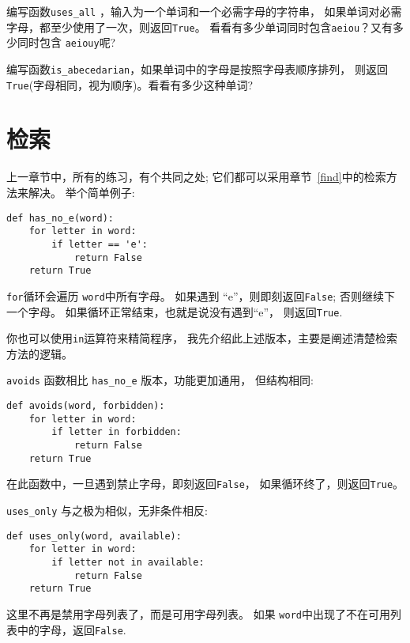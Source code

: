 \documentclass[10pt]{book}
\begin{document}
\begin{exercise} 

编写函数\verb"uses_all" ，输入为一个单词和一个必需字母的字符串，
如果单词对必需字母，都至少使用了一次，则返回{\tt True}。
看看有多少单词同时包含{\tt aeiou}？又有多少同时包含 {\tt aeiouy}呢?

\end{exercise}


\begin{exercise}
编写函数\verb"is_abecedarian"，如果单词中的字母是按照字母表顺序排列，
则返回 {\tt True}(字母相同，视为顺序)。看看有多少这种单词?


\end{exercise}


\section{检索}
\label{search}

上一章节中，所有的练习，有个共同之处;
它们都可以采用章节~\ref{find}中的检索方法来解决。
举个简单例子:

\begin{verbatim}
def has_no_e(word):
    for letter in word:
        if letter == 'e':
            return False
    return True
\end{verbatim}
%
{\tt for}循环会遍历 {\tt word}中所有字母。
如果遇到 ``e''，则即刻返回{\tt False};
否则继续下一个字母。
如果循环正常结束，也就是说没有遇到``e''， 则返回{\tt True}.

你也可以使用{\tt in}运算符来精简程序，
我先介绍此上述版本，主要是阐述清楚检索方法的逻辑。

{\tt avoids} 函数相比 \verb"has_no_e" 版本，功能更加通用，
但结构相同:

\begin{verbatim}
def avoids(word, forbidden):
    for letter in word:
        if letter in forbidden:
            return False
    return True
\end{verbatim}
%
在此函数中，一旦遇到禁止字母，即刻返回{\tt False}，
如果循环终了，则返回{\tt True}。

\verb"uses_only" 与之极为相似，无非条件相反:

\begin{verbatim}
def uses_only(word, available):
    for letter in word: 
        if letter not in available:
            return False
    return True
\end{verbatim}
%
这里不再是禁用字母列表了，而是可用字母列表。
如果 {\tt word}中出现了不在可用列表中的字母，返回{\tt False}.
\end{document}
